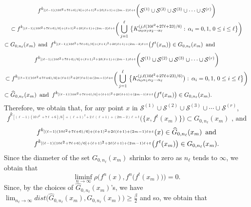 \documentclass[12pt]{article}
\newcommand{\al}{\alpha}
\begin{document}
\begin{multline*}
$$
f^{k_{[(\ell-1)(10\ell^2+7\ell+6)/6]+(\ell+1)^2+2\ell(\ell+1)+(2m-2)\ell+t}}\bigg(\mathcal S^{(1)} \cup \mathcal S^{(2)} \cup \mathcal S^{(3)} \cup \cdots \cup \mathcal S^{(r)}\bigg) \\
\subset f^{k_{[(\ell-1)(10\ell^2+7\ell+6)/6]+(\ell+1)^2+2\ell(\ell+1)+(2m-2)\ell+t}}\bigg(\bigcup_{j=1}^\ell \, \big\{ K_{\al_0\al_1\al_2\cdots\al_\ell}^{(j, \ell(10\ell^2+27\ell+23)/6)}: \, \al_i = 0, 1, \, 0 \le i \le \ell \big\}\bigg) \\ 
\subset G_{0,n_\ell}(x_m) \,\,\, \text{and} \,\,\, f^{k_{[(\ell-1)(10\ell^2+7\ell+6)/6]+(\ell+1)^2+2\ell(\ell+1)+(2m-2)\ell+t}}\big(f^t(x_m)\big) \in G_{0,n_\ell}(x_m) \,\,\, \text{and}\qquad\qquad\qquad
$$
\end{multline*}
\begin{multline*}
$$
f^{k_{[(\ell-1)(10\ell^2+7\ell+6)/6]+(\ell+1)^2+2\ell(\ell+1)+(2m-1)\ell+t}}\bigg(\mathcal S^{(1)} \cup \mathcal S^{(2)} \cup \mathcal S^{(3)} \cup \cdots \cup \mathcal S^{(r)}\bigg) \\
\subset f^{k_{[(\ell-1)(10\ell^2+7\ell+6)/6]+(\ell+1)^2+2\ell(\ell+1)+(2m-1)\ell+t}}\bigg(\bigcup_{j=1}^\ell \, \big\{ K_{\al_0\al_1\al_2\cdots\al_\ell}^{(j, \ell(10\ell^2+27\ell+23)/6)}\big): \, \al_i = 0, 1, \, 0 \le i \le \ell \big\}\bigg) \\ 
\subset \widehat G_{0,n_\ell}(x_m) \,\,\, \text{and} \,\,\, f^{k_{[(\ell-1)(10\ell^2+7\ell+6)/6]+(\ell+1)^2+2\ell(\ell+1)+(2m-1)\ell+t}}\big(f^t(x_m)\big) \in G_{0,n_\ell}(x_m).\qquad\qquad\qquad\,\,
$$
\end{multline*}
Therefore, we obtain that, for any point $x$ in $\mathcal S^{(1)} \cup \mathcal S^{(2)} \cup \mathcal S^{(3)} \cup \cdots \cup \mathcal S^{(r)}$,  
$$
f^{k_{[(\ell-1)(10\ell^2+7\ell+6)/6]+(\ell+1)^2+2\ell(\ell+1)+(2m-2)\ell+t}}\big(\{ x, f^t(x_m) \}\big) \subset G_{0,n_\ell}(x_m) \,\,,\, \text{and}
$$
\begin{multline*}
$$
f^{k_{[(\ell-1)(10\ell^2+7\ell+6)/6]+(\ell+1)^2+2\ell(\ell+1)+(2m-1)\ell+t}}(x) \in \widehat G_{0,n_\ell}(x_m) \,\,\, \text{and} \\ f^{k_{[(\ell-1)(10\ell^2+7\ell+6)/6]+(\ell+1)^2+2\ell(\ell+1)+(2m-1)\ell+t}}\big(f^t(x_m)\big) \in G_{0,n_\ell}(x_m).
$$
\end{multline*}
\indent Since the diameter of the set $G_{0,n_\ell}(x_m)$ shrinks to zero as $n_\ell$ tends to $\infty$, we obtain that 
$$
\liminf_{n \to \infty} \rho\bigg(f^n(x), f^n\big(f^t(x_m)\big)\bigg) = 0.
$$
\indent Since, by the choices of $\widehat G_{0,n_\ell}(x_m)$'s, we have $\lim_{n_\ell \to \infty} dist\big(\widehat G_{0,n_\ell}(x_m), G_{0,n_\ell}(x_m)\big) \ge \frac \beta2$ and so, we obtain that 
\end{document}
